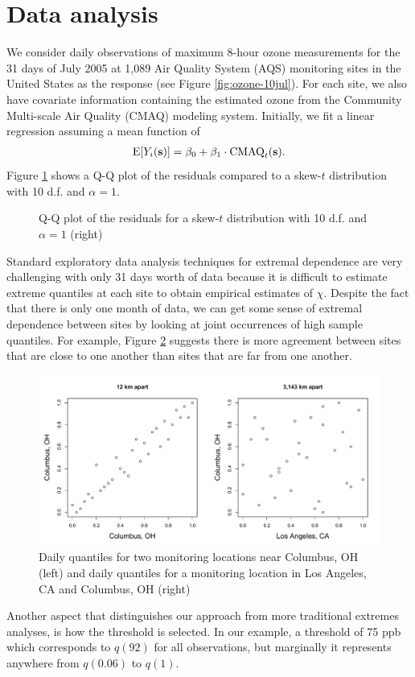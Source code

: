 \documentclass[11pt]{article}
\begin{document}
\section{Data analysis}\label{s:analysis}
We consider daily observations of maximum 8-hour ozone measurements for the 31 days of July 2005 at 1,089 Air Quality System (AQS) monitoring sites in the United States as the response (see Figure \ref{fig:ozone-10jul}).
For each site, we also have covariate information containing the estimated ozone from the Community Multi-scale Air Quality (CMAQ) modeling system.
Initially, we fit a linear regression assuming a mean function of
\begin{align}
  \text{E}[Y_i(\mbox{\bf s})] = \beta_0 + \beta_1 \cdot \text{CMAQ}_t(\mbox{\bf s}). \label{eq:datamean}
\end{align}
Figure \ref{fig:ozone-qq} shows a Q-Q plot of the residuals compared to a skew-$t$ distribution with 10 d.f. and $\alpha = 1$.
\begin{figure}
  \centering
  \caption{Q-Q plot of the residuals for a skew-$t$ distribution with 10 d.f. and $\alpha = 1$ (right)}
  \label{fig:ozone-qq}
\end{figure}

Standard exploratory data analysis techniques for extremal dependence are very challenging with only 31 days worth of data because it is difficult to estimate extreme quantiles at each site to obtain empirical estimates of $\chi$.
Despite the fact that there is only one month of data, we can get some sense of extremal dependence between sites by looking at joint occurrences of high sample quantiles.
For example, Figure \ref{fig:bivariateozone} suggests there is more agreement between sites that are close to one another than sites that are far from one another.
\begin{figure}
  \centering
  \includegraphics[width=\linewidth]{plots/daily-quantiles-ozone.pdf}
  \caption{Daily quantiles for two monitoring locations near Columbus, OH (left) and daily quantiles for a monitoring location in Los Angeles, CA and Columbus, OH (right)}
  \label{fig:bivariateozone}
\end{figure}
Another aspect that distinguishes our approach from more traditional extremes analyses, is how the threshold is selected.
In our example, a threshold of 75 ppb which corresponds to $q(92)$ for all observations, but marginally it represents anywhere from $q(0.06)$ to $q(1)$.
\end{document}
